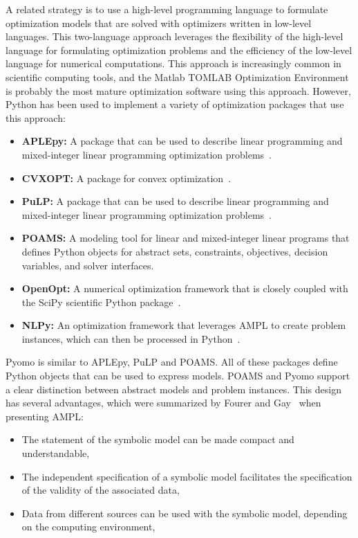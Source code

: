 
A related strategy is to use a high-level programming language to
formulate optimization models that are solved with optimizers written in
low-level languages.  This two-language approach leverages the flexibility
of the high-level language for formulating optimization problems and
the efficiency of the low-level language for numerical computations.
This approach is increasingly common in scientific computing tools, and
the Matlab TOMLAB Optimization Environment~\citep{TOMLAB} is probably
the most mature optimization software using this approach.  However, 
Python has been used to implement a variety of optimization packages that use this approach:
\begin{itemize}

\item {\bf APLEpy:} A package that can be used to describe linear programming and mixed-integer linear programming optimization problems~\citep{APLEpy,KurGra07}. 

\item {\bf CVXOPT:} A package for convex optimization~\citep{CVXOPT}.

\item {\bf PuLP:} A package that can be used to describe linear programming and mixed-integer linear programming optimization problems~\citep{PuLP}. 

\item {\bf POAMS:} A modeling tool for linear and mixed-integer linear programs that defines Python objects for abstract sets, constraints, objectives, decision variables, and solver interfaces.  

\item {\bf OpenOpt:} A numerical optimization framework that is closely coupled with the SciPy scientific Python package~\citep{OpenOpt}.   

\item {\bf NLPy:} An optimization framework that leverages AMPL to create problem instances, which can then be processed in Python~\citep{NLPy}.
\end{itemize}

Pyomo is similar to APLEpy, PuLP and POAMS.  All of these packages
define Python objects that can be used to express models. POAMS and Pyomo support
a clear distinction between abstract models and problem
instances.  This design has several advantages, which were summarized by Fourer and Gay~\citep{FouGay03} when presenting AMPL:
\begin{itemize}

\item The statement of the symbolic model can be made compact and understandable,

\item The independent specification of a symbolic model facilitates the specification of the validity of the associated data,

\item Data from different sources can be used with the symbolic model, depending on the computing environment,
\end{itemize}


